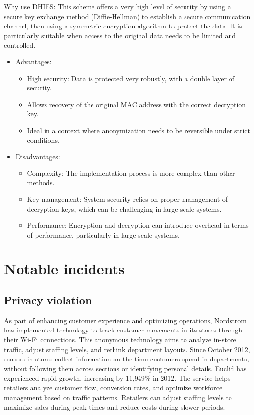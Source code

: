 \documentclass{article}
\begin{document}
  Why use DHIES: This scheme offers a very high level of security by using a secure key exchange method
  (Diffie-Hellman) to establish a secure communication channel, then using a symmetric encryption algorithm
  to protect the data. It is particularly suitable when access to the original data needs to be 
  limited and controlled.

  \begin{itemize}
    \item Advantages:
      \begin{itemize}
      \item High security: Data is protected very robustly, with a double layer of security.
      \item Allows recovery of the original MAC address with the correct decryption key.
      \item Ideal in a context where anonymization needs to be reversible under strict conditions.
      \end{itemize}
    \item Disadvantages:
      \begin{itemize}
      \item Complexity: The implementation process is more complex than other methods.
      \item Key management: System security relies on proper management of decryption keys, 
      which can be challenging in large-scale systems.
      \item Performance: Encryption and decryption can introduce overhead in terms of performance, 
      particularly in large-scale systems.
      \end{itemize}
  \end{itemize}


\section{\label{sec:Notable incidents}Notable incidents}
  \subsection{\label{subsec:Nordstrom}Privacy violation}
  As part of enhancing customer experience and optimizing operations, Nordstrom has 
  implemented technology to track customer movements in its stores through their 
  Wi-Fi connections. This anonymous technology aims to analyze in-store traffic, 
  adjust staffing levels, and rethink department layouts. Since October 2012, 
  sensors in stores collect information on the time customers spend in departments, 
  without following them across sections or identifying personal details.
  Euclid has experienced rapid growth, increasing by 11,949\% in 2012. 
  The service helps retailers analyze customer flow, conversion rates, and 
  optimize workforce management based on traffic patterns. Retailers can adjust 
  staffing levels to maximize sales during peak times and reduce costs during slower periods.
\end{document}
